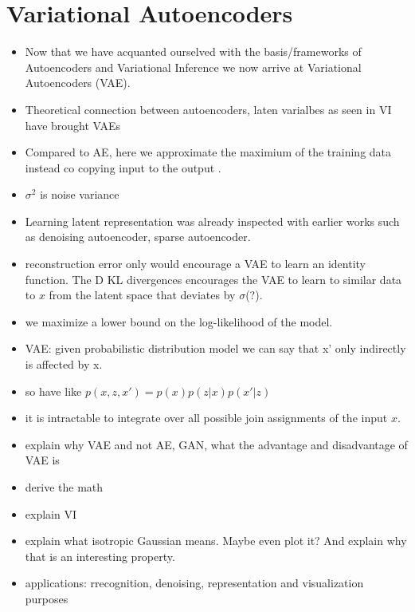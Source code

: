 \section{Variational Autoencoders}
\begin{itemize}
    \item Now that we have acquanted ourselved with the basis/frameworks of Autoencoders and Variational Inference we now arrive at Variational Autoencoders (VAE).
    \item Theoretical connection between autoencoders, laten varialbes as seen in VI have brought VAEs
    \item Compared to AE, here we approximate the maximium of the training data instead co copying input to the output \cite{Goodfellow-et-al-2016}.
    \item $\sigma^2$ is noise variance
    \item Learning latent representation was already inspected with earlier works such as denoising autoencoder, sparse autoencoder.
    \item reconstruction error only would encourage a VAE to learn an identity function. The D KL divergences encourages the VAE to learn to similar data to $x$ from the latent space that deviates by $\sigma$(?).
    \item we maximize a lower bound on the log-likelihood of the model. 
    \item VAE: given probabilistic distribution model we can say that x' only indirectly is affected by x.
    \item so have like $p(x,z,x') = p(x)p(z|x)p(x'|z)$
    \item it is intractable to integrate over all possible join assignments of the input $x$.
\end{itemize}

\begin{itemize}
    \item explain why VAE and not AE, GAN, what the advantage and disadvantage of VAE is
    \item derive the math 
    \item explain VI
    \item explain what isotropic Gaussian means. Maybe even plot it? And explain why that is an interesting property.
    \item applications: rrecognition, denoising, representation and visualization purposes \cite{KingmaWelling}
\end{itemize}

